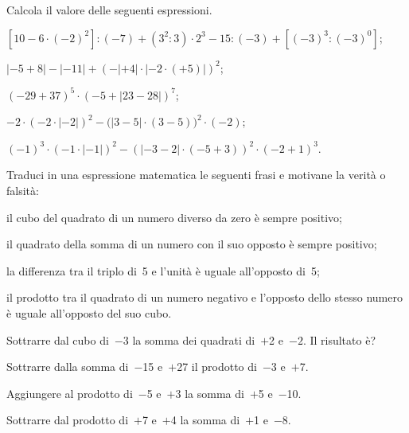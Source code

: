 \begin{esercizio}[\Ast]
Calcola il valore delle seguenti espressioni.
 \begin{enumeratea}
 \item $[10-6\cdot(-2)^2]:(-7)+(3^2:3)\cdot2^3-15:(-3)+[(-3)^3:(-3)^0]$;
 \item $|-5+8|-|-11|+(-|+4|\cdot|-2\cdot(+5)|)^2$;
 \item $(-29+37)^5\cdot(-5+|23-28|)^7$;
 \item $-2\cdot(-2\cdot|-2|)^2-\big(|3-5|\cdot(3-5)\big)^2\cdot(-2)$;
 \item $(-1)^3\cdot(-1\cdot|-1|)^2-(|-3-2|\cdot(-5+3))^2\cdot(-2+1)^3$.
 \end{enumeratea}
\end{esercizio}
\begin{multicols}{2}
\begin{esercizio}
Traduci in una espressione matematica le seguenti frasi e motivane la verità o falsità:
 \begin{enumeratea}
 \item il cubo del quadrato di un numero diverso da zero è sempre positivo;
 \item il quadrato della somma di un numero con il suo opposto è sempre positivo;
 \item la differenza tra il triplo di~5 e l’unità è uguale all’opposto di~5;
 \item il prodotto tra il quadrato di un numero negativo e l’opposto dello stesso numero è uguale all’opposto del suo cubo.
 \end{enumeratea}
\end{esercizio}

\begin{esercizio}
 Sottrarre dal cubo di~$-3$ la somma dei quadrati di~$+$2 e~$-2$. Il risultato è?
\end{esercizio}

\begin{esercizio}
 Sottrarre dalla somma di~$-$15 e~$+$27 il prodotto di~$-$3 e~$+$7.
\end{esercizio}

\begin{esercizio}
 Aggiungere al prodotto di~$-$5 e~$+$3 la somma di~$+$5 e~$-$10.
\end{esercizio}

\begin{esercizio}
 Sottrarre dal prodotto di~$+$7 e~$+$4 la somma di~$+$1 e~$-$8.
\end{esercizio}


\end{multicols}

